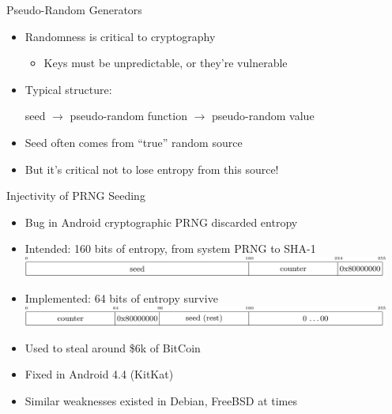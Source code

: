 \documentclass[ignorenonframetext,]{beamer}
\providecommand{\tightlist}{%
  \setlength{\itemsep}{0pt}\setlength{\parskip}{0pt}}
\begin{document}
\begin{frame}{Pseudo-Random Generators}

\begin{itemize}
\tightlist
\item
  Randomness is critical to cryptography

  \begin{itemize}
  \tightlist
  \item
    Keys must be unpredictable, or they're vulnerable
  \end{itemize}
\item
  Typical structure:

  \begin{center}
  seed $\rightarrow$ pseudo-random function $\rightarrow$ pseudo-random value
  \end{center}
\item
  Seed often comes from ``true'' random source
\item
  But it's critical not to lose entropy from this source!
\end{itemize}

\end{frame}

\begin{frame}{Injectivity of PRNG Seeding}

\begin{itemize}
\tightlist
\item
  Bug in Android cryptographic PRNG discarded entropy
\item
  Intended: 160 bits of entropy, from system PRNG to SHA-1
  \includegraphics[width=0.95\textwidth]{images/prng-intended.pdf}
\item
  Implemented: 64 bits of entropy survive
  \includegraphics[width=0.95\textwidth]{images/prng-buggy.pdf}
\item
  Used to steal around \$6k of BitCoin
\item
  Fixed in Android 4.4 (KitKat)
\item
  Similar weaknesses existed in Debian, FreeBSD at times
\end{itemize}

\end{frame}
\end{document}
